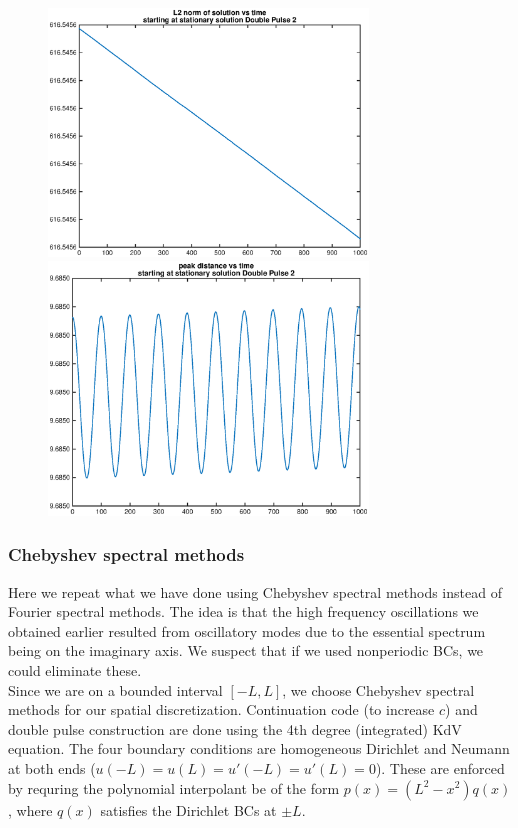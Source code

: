 \documentclass[12pt]{article}
\begin{document}
\begin{figure}[H]
	\includegraphics[width=8.5cm]{L2stationary1a.eps}
	\includegraphics[width=8.5cm]{diststationary1a.eps}
\end{figure}

\subsubsection*{Chebyshev spectral methods}

Here we repeat what we have done using Chebyshev spectral methods instead of Fourier spectral methods. The idea is that the high frequency oscillations we obtained earlier resulted from oscillatory modes due to the essential spectrum being on the imaginary axis. We suspect that if we used nonperiodic BCs, we could eliminate these.\\

Since we are on a bounded interval $[-L, L]$, we choose Chebyshev spectral methods for our spatial discretization. Continuation code (to increase $c$) and double pulse construction are done using the 4th degree (integrated) KdV equation. The four boundary conditions are homogeneous Dirichlet and Neumann at both ends ($u(-L) = u(L) = u'(-L) = u'(L) = 0$). These are enforced by requring the polynomial interpolant be of the form $p(x) = (L^2 - x^2)q(x)$, where $q(x)$ satisfies the Dirichlet BCs at $\pm L$.\\
\end{document}
